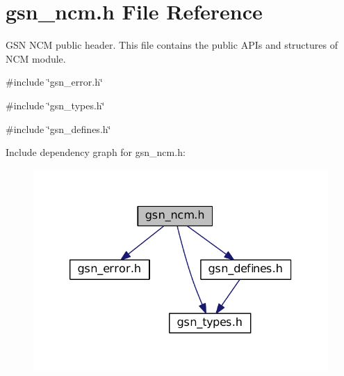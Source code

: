 \hypertarget{a00529}{
\section{gsn\_\-ncm.h File Reference}
\label{a00529}
}


GSN NCM public header. This file contains the public APIs and structures of NCM module.  


{\ttfamily \#include \char`\"{}gsn\_\-error.h\char`\"{}}\par
{\ttfamily \#include \char`\"{}gsn\_\-types.h\char`\"{}}\par
{\ttfamily \#include \char`\"{}gsn\_\-defines.h\char`\"{}}\par
Include dependency graph for gsn\_\-ncm.h:
\nopagebreak
\begin{figure}[H]
\begin{center}
\leavevmode
\includegraphics[width=320pt]{a00764}
\end{center}
\end{figure}
